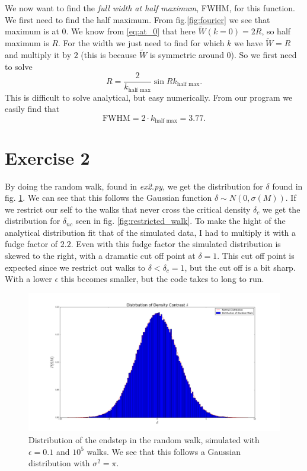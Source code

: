 \documentclass[a4paper,norsk, 10pt]{article}
\begin{document}
We now want to find the \textit{full width at half maximum}, FWHM, for this function. We first need to find the half maximum. From fig.\ref{fig:fourier} we see that maximum is at $0$. We know from \eqref{eq:at_0} that here $\tilde{W}(k=0) = 2R$, so half maximum is $R$. For the width we just need to find for which $k$ we have $\tilde{W} = R$ and multiply it by $2$ (this is because $\tilde{W}$ is symmetric around $0$). So we first need to solve
\begin{equation}
R = \frac{2}{k_{\text{half max}}}\sin Rk_{\text{half max}}.
\end{equation}
This is difficult to solve analytical, but easy numerically. From our program we easily find that 
\begin{equation}
\text{FWHM} = 2\cdot k_{\text{half max}} = 3.77.
\end{equation}

\section{Exercise 2}

By doing the random walk, found in \textit{ex2.py}, we get the distribution for $\delta$ found in fig. \ref{fig:walk}. We can see that this follows the Gaussian function $\delta \sim N(0,\sigma(M))$. If we restrict our self to the walks that never cross the critical density $\delta_c$ we get the distribution for $\delta_{nc}$ seen in fig. \ref{fig:restricted_walk}. To make the hight of the analytical distribution fit that of the simulated data, I had to multiply it with a fudge factor of $2.2$. Even with this fudge factor the simulated distribution is skewed to the right, with a dramatic cut off point at $\delta = 1$. This cut off point is expected since we restrict out walks to $\delta < \delta_c = 1$, but the cut off is a bit sharp. With a lower $\epsilon$ this becomes smaller, but the code takes to long to run.

\begin{figure}[H]
\centering
\includegraphics[scale=0.3]{dist}
\caption{Distribution of the endstep in the random walk, simulated with $\epsilon = 0.1$ and $10^5$ walks. We see that this follows a Gaussian distribution with $\sigma^2 = \pi$.}\label{fig:walk}
\end{figure}
\end{document}
